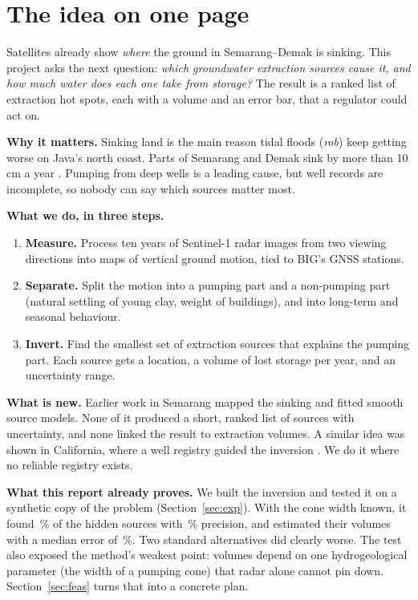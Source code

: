 \section{The idea on one page}

\begin{inshort}
Satellites already show \emph{where} the ground in Semarang--Demak is sinking. This project asks the
next question: \emph{which groundwater extraction sources cause it, and how much water does each one
take from storage?} The result is a ranked list of extraction hot spots, each with a volume and an
error bar, that a regulator could act on.
\end{inshort}

\textbf{Why it matters.} Sinking land is the main reason tidal floods (\emph{rob}) keep getting worse on
Java's north coast. Parts of Semarang and Demak sink by more than 10\,cm a year
\cite{aditiya2023,janur2025}. Pumping from deep wells is a leading cause, but well records are
incomplete, so nobody can say which sources matter most.

\textbf{What we do, in three steps.}
\begin{enumerate}
\item \textbf{Measure.} Process ten years of Sentinel-1 radar images from two viewing directions into
      maps of vertical ground motion, tied to BIG's GNSS stations.
\item \textbf{Separate.} Split the motion into a pumping part and a non-pumping part (natural settling
      of young clay, weight of buildings), and into long-term and seasonal behaviour.
\item \textbf{Invert.} Find the smallest set of extraction sources that explains the pumping part.
      Each source gets a location, a volume of lost storage per year, and an uncertainty range.
\end{enumerate}

\textbf{What is new.} Earlier work in Semarang mapped the sinking and fitted smooth source models.
None of it produced a short, ranked list of sources with uncertainty, and none linked the result to
extraction volumes. A similar idea was shown in California, where a well registry guided the
inversion \cite{vasco2019}. We do it where no reliable registry exists.

\textbf{What this report already proves.} We built the inversion and tested it on a synthetic copy of
the problem (Section~\ref{sec:exp}). With the cone width known, it found \calRecall\,\% of the
hidden sources with \calPrecision\,\% precision, and estimated their volumes with a median error of
\calMedErr\,\%. Two standard alternatives did clearly worse. The test also exposed the method's
weakest point: volumes depend on one hydrogeological parameter (the width of a pumping cone) that
radar alone cannot pin down. Section~\ref{sec:feas} turns that into a concrete plan.

